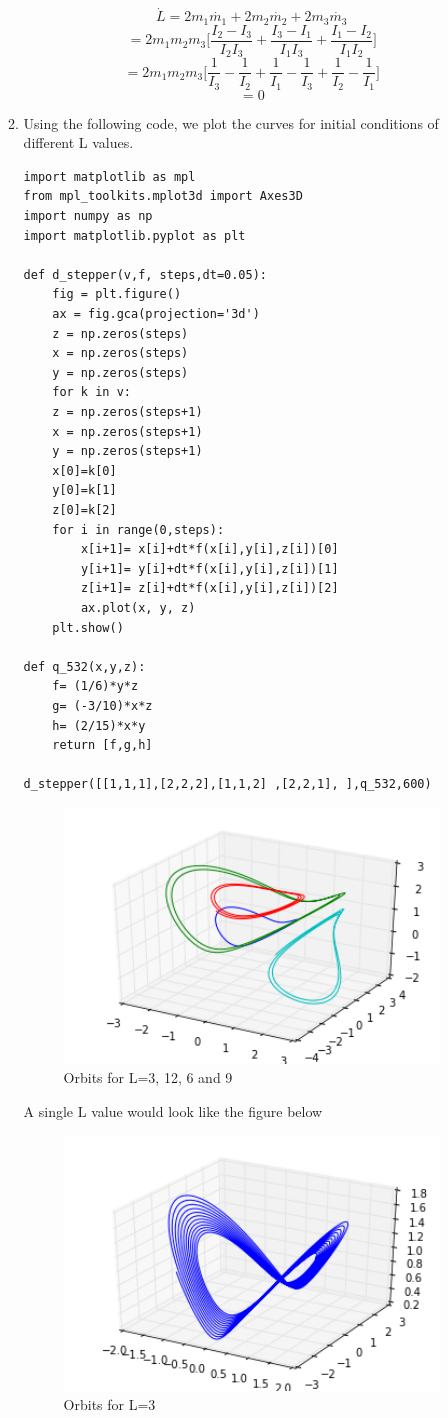 \documentclass[a4paper,12pt]{article}
\begin{document}
\begin{enumerate}
\begin{enumerate}
	\[\dot{L}= 2m_1 \dot{m_1} +2m_2 \dot{m_2} + 2m_3 \dot{m_3}\] \[=2m_1m_2m_3\bigg[\frac{I_2-I_3}{I_2I_3}+ \frac{I_3-I_1}{I_1I_3} +\frac{I_1-I_2}{I_1I_2} \bigg]\] \[=2m_1m_2m_3\bigg[\frac{1}{I_3}- \frac{1}{I_2}+\frac{1}{I_1} - \frac{1}{I_3}+ \frac{1}{I_2} -\frac{1}{I_1} \bigg]\]
	\[ =0\]
\item
Using the following code, we plot the curves for initial conditions of different L values.
\begin{lstlisting}[style=MyPythonstyle]
import matplotlib as mpl
from mpl_toolkits.mplot3d import Axes3D
import numpy as np
import matplotlib.pyplot as plt

def d_stepper(v,f, steps,dt=0.05):
	fig = plt.figure()
	ax = fig.gca(projection='3d')
	z = np.zeros(steps)
	x = np.zeros(steps)
	y = np.zeros(steps)
	for k in v:
	z = np.zeros(steps+1)
	x = np.zeros(steps+1)
	y = np.zeros(steps+1)
	x[0]=k[0]
	y[0]=k[1]
	z[0]=k[2]
	for i in range(0,steps):
		x[i+1]= x[i]+dt*f(x[i],y[i],z[i])[0]
		y[i+1]= y[i]+dt*f(x[i],y[i],z[i])[1]
		z[i+1]= z[i]+dt*f(x[i],y[i],z[i])[2]
		ax.plot(x, y, z)
	plt.show()

def q_532(x,y,z):
	f= (1/6)*y*z
	g= (-3/10)*x*z
	h= (2/15)*x*y
	return [f,g,h]
	
d_stepper([[1,1,1],[2,2,2],[1,1,2] ,[2,2,1], ],q_532,600)	
\end{lstlisting}
\begin{figure}[H] 
	\centering
	\includegraphics[width=10cm]{Lspace}
	\caption{Orbits for L=3, 12, 6 and 9 }
\end{figure}

A single L value would look like the figure below
\begin{figure}[H] 
	\centering
	\includegraphics[width=10cm]{singleL}
	\caption{Orbits for L=3 }
\end{figure}
\end{enumerate}



\end{enumerate}
\end{document}
